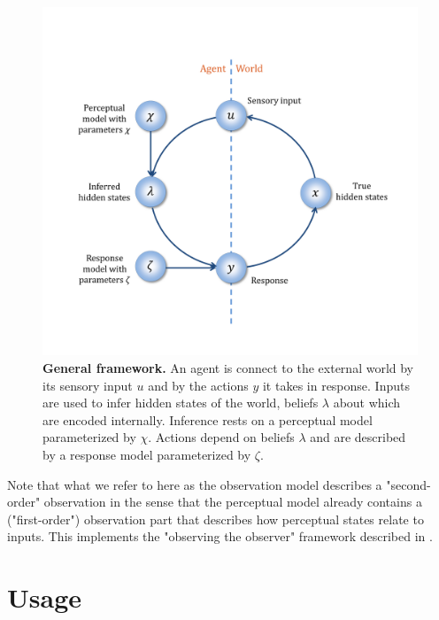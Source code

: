 \documentclass[11pt,a4paper]{article}
\numberwithin{equation}{section}
\begin{document}
\begin{figure}[h]
\renewcommand{\baselinestretch}{1}
\begin{center}
\includegraphics[width=14cm]{Graphics/Slide1}

\vspace{1ex}
\parbox{14cm}{\caption{\label{Slide1}
\textbf{\upshape General framework.}
An agent is connect to the external world by its sensory input $u$
and by the actions $y$ it takes in response. Inputs are used to infer
hidden states of the world, beliefs $\lambda$ about which are encoded
internally. Inference rests on a perceptual model parameterized by
$\chi$. Actions depend on beliefs $\lambda$ and are described by a
response model parameterized by $\zeta$.}}
\end{center}
\end{figure}
 
Note that what we refer to here as the observation model describes a
"second-order" observation in the sense that the perceptual model
already contains a ("first-order") observation part that describes how
perceptual states relate to inputs. This implements the "observing the
observer" framework described in \citet{daunizeau_observing_2010}.


\section{Usage}
\label{sec:usage}
\end{document}
